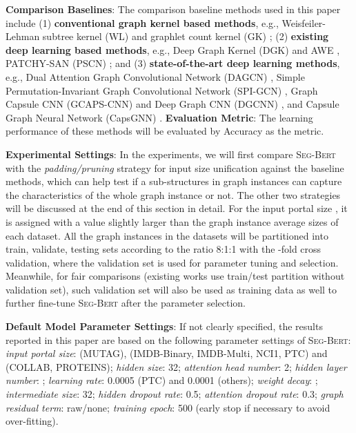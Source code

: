 \documentclass{article}
\newcommand{\our}{\textsc{Seg-Bert}}
\begin{document}
\noindent \textbf{Comparison Baselines}: The comparison baseline methods used in this paper include (1) \textbf{conventional graph kernel based methods}, e.g., Weisfeiler-Lehman subtree kernel (WL) \cite{Shervashidze_WL_11} and graphlet count kernel (GK) \cite{pmlr-v5-shervashidze09a}; (2) \textbf{existing deep learning based methods}, e.g., Deep Graph Kernel (DGK) \cite{Yanardag_Deep_15} and AWE \cite{Ivanov_Anonymous_18}, PATCHY-SAN (PSCN) \cite{Niepert_Learning_16}; and (3) \textbf{state-of-the-art deep learning methods}, e.g., Dual Attention Graph Convolutional Network (DAGCN) \cite{Chen_Dual_19}, Simple Permutation-Invariant Graph Convolutional Network (SPI-GCN) \cite{SPIGCN}, Graph Capsule CNN (GCAPS-CNN) \cite{verma2018graph} and Deep Graph CNN (DGCNN) \cite{Zhang2018AnED}, and Capsule Graph Neural Network (CapsGNN) \cite{xinyi2018capsule}. \textbf{Evaluation Metric}: The learning performance of these methods will be evaluated by Accuracy as the metric.

\noindent \textbf{Experimental Settings}: In the experiments, we will first compare {\our} with the \textit{padding/pruning} strategy for input size unification against the baseline methods, which can help test if a sub-structures in graph instances can capture the characteristics of the whole graph instance or not. The other two strategies will be discussed at the end of this section in detail. For the input portal size , it is assigned with a value slightly larger than the graph instance average sizes of each dataset. All the graph instances in the datasets will be partitioned into train, validate, testing sets according to the ratio 8:1:1 with the -fold cross validation, where the validation set is used for parameter tuning and selection. Meanwhile, for fair comparisons (existing works use  train/test partition without validation set), such  validation set will also be used as training data as well to further fine-tune {\our} after the parameter selection.

\noindent \textbf{Default Model Parameter Settings}: If not clearly specified, the results reported in this paper are based on the following parameter settings of {\our}: \textit{input portal size}:  (MUTAG),  (IMDB-Binary, IMDB-Multi, NCI1, PTC) and  (COLLAB, PROTEINS); \textit{hidden size}: 32; \textit{attention head number}: 2; \textit{hidden layer number}: ; \textit{learning rate}: 0.0005 (PTC) and 0.0001 (others); \textit{weight decay}: ; \textit{intermediate size}: 32; \textit{hidden dropout rate}: 0.5; \textit{attention dropout rate}: 0.3; \textit{graph residual term}: raw/none; \textit{training epoch}: 500 (early stop if necessary to avoid over-fitting).
\end{document}
